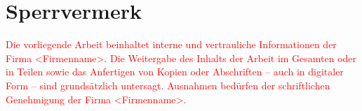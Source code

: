 \section*{Sperrvermerk}
\textcolor{red}{
    Die vorliegende Arbeit beinhaltet interne und vertrauliche Informationen der Firma <Firmenname>.
    Die Weitergabe des Inhalts der Arbeit im Gesamten oder in Teilen sowie das Anfertigen
    von Kopien oder Abschriften -- auch in digitaler Form -- sind grundsätzlich untersagt. %
    Ausnahmen bedürfen der schriftlichen Genehmigung der Firma <Firmenname>.
}
